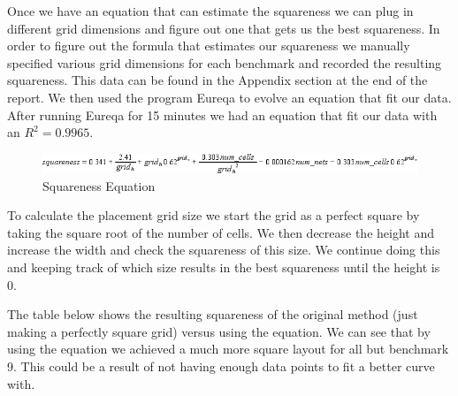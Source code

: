 \documentclass[10pt]{article}
\begin{document}
        Once we have an equation that can estimate the squareness we can plug
        in different grid dimensions and figure out one that gets us the best
        squareness. In order to figure out the formula that estimates our
        squareness we manually specified various grid dimensions for each
        benchmark and recorded the resulting squareness. This data can be found
        in the Appendix section at the end of the report. We then used the
        program Eureqa to evolve an equation that fit our data. After running
        Eureqa for 15 minutes we had an equation that fit our data with an $
        R^{2} =  0.9965 $.

        \begin{figure}[H]
            \centering
            \includegraphics[width=\linewidth]{./square_eq.png}
            \caption{Squareness Equation}
        \end{figure}

        To calculate the placement grid size we start the grid as a perfect
        square by taking the square root of the number of cells. We then
        decrease the height and increase the width and check the squareness of
        this size. We continue doing this and keeping track of which size
        results in the best squareness until the height is 0.

        The table below shows the resulting squareness of the original method
        (just making a perfectly square grid) versus using the equation. We
        can see that by using the equation we achieved a much more square
        layout for all but benchmark 9. This could be a result of not having
        enough data points to fit a better curve with.
\end{document}
